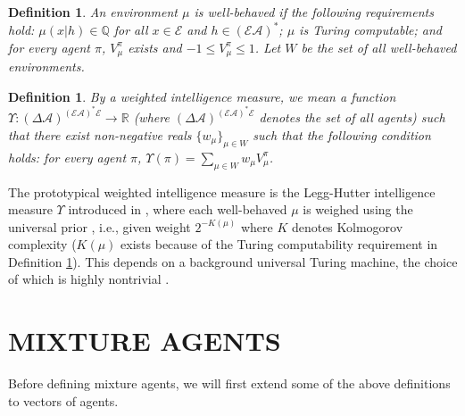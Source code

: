 \documentclass[twoside]{article}
\newtheorem{definition}[theorem]{Definition}
\begin{document}
\begin{definition}
\label{wellbehaveddefn}
    An environment $\mu$ is \emph{well-behaved} if the following
    requirements hold: $\mu(x|h)\in\mathbb Q$
    for all $x\in\mathcal E$ and $h\in (\mathcal E\mathcal A)^*$; $\mu$ is Turing
    computable; and for every agent $\pi$, $V^\pi_\mu$ exists and
    $-1\leq V^\pi_\mu\leq 1$. Let $W$ be the set of all well-behaved environments.
\end{definition}

\begin{definition}
\label{performanceaveragerdefn}
    By a \emph{weighted intelligence measure}, we mean a function
    $
        \Upsilon:
        (\Delta\mathcal A)^{(\mathcal E\mathcal A)^*\mathcal E}
        \to
        \mathbb R
    $
    (where
    $(\Delta\mathcal A)^{(\mathcal E\mathcal A)^*\mathcal E}$ denotes the set of all agents)
    such that there exist non-negative reals $\{w_\mu\}_{\mu\in W}$ such that the following
    condition holds:
    for every agent $\pi$, $\Upsilon(\pi)=\sum_{\mu\in W}w_\mu V^\pi_\mu$.
\end{definition}

The prototypical weighted intelligence measure is the Legg-Hutter intelligence
measure $\Upsilon$ introduced in \cite{legg2007universal},
where each well-behaved $\mu$ is
weighed using the universal prior \cite{li2008introduction,DBLP:conf/alt/Hutter03}, i.e.,
given weight $2^{-K(\mu)}$
where $K$ denotes Kolmogorov complexity ($K(\mu)$ exists because of the Turing
computability requirement in Definition \ref{wellbehaveddefn}).
This depends on a background universal
Turing machine, the choice of which is highly nontrivial
\cite{leike2015bad}.

\section{MIXTURE AGENTS}

Before defining mixture agents, we will first extend some of the above
definitions to vectors of agents.
\end{document}
